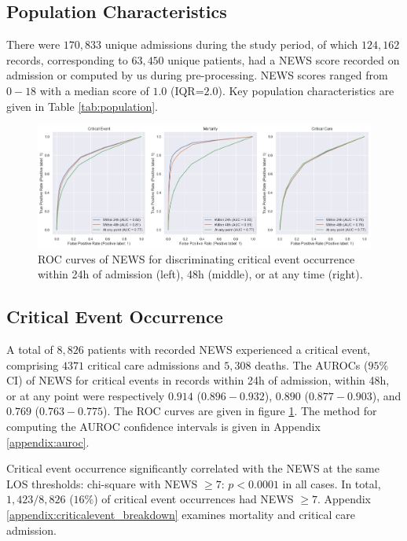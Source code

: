 \documentclass[10pt,journal, compsoc]{IEEEtran}
\begin{document}
\subsection{Population Characteristics}

There were $170,833$ unique admissions during the study period, of which $124,162$ records, corresponding to $63,450$ unique patients, had a NEWS score recorded on admission or computed by us during pre-processing. NEWS scores ranged from $0-18$ with a median score of $1.0$ (IQR=$2.0$). Key population characteristics are given in Table \ref{tab:population}.

\begin{figure}[tbp]
    \centering
    \includegraphics[width=\textwidth]{img/critical_roc_multi.png}
    \caption{ROC curves of NEWS for discriminating critical event occurrence within 24h of admission (left), 48h (middle), or at any time (right).}
    \label{fig:criticalevent_roc}
\end{figure}

\subsection{Critical Event Occurrence} A total of $8,826$ patients with recorded NEWS experienced a critical event, comprising $4371$ critical care admissions and $5,308$ deaths. The AUROCs ($95\%$ CI) of NEWS for critical events in records within 24h of admission, within 48h, or at any point were respectively $0.914$ ($0.896-0.932$), $0.890$ ($0.877-0.903$), and $0.769$ ($0.763-0.775$). The ROC curves are given in figure \ref{fig:criticalevent_roc}. The method for computing the AUROC confidence intervals is given in Appendix \ref{appendix:auroc}.

Critical event occurrence significantly correlated with the NEWS at the same LOS thresholds: chi-square with NEWS $\geq 7$: $p < 0.0001$ in all cases. In total, $1,423/8,826$ ($16\%$) of critical event occurrences had NEWS $\geq 7$. Appendix \ref{appendix:criticalevent_breakdown} examines mortality and critical care admission.
\end{document}

